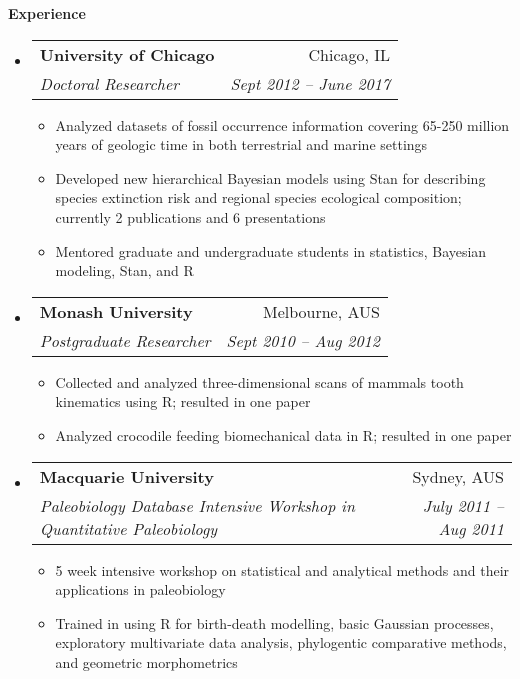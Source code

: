 \documentclass[letterpaper,11pt]{article}
\makeatletter
\newcommand{\resitem}[1]{\item #1 \vspace{-2pt}}
\newcommand{\resheading}[1]{{\large \colorbox{mygrey}{\begin{minipage}{\textwidth}{\textbf{#1 \vphantom{p\^{E}}}}\end{minipage}}}}
\newcommand{\ressubheading}[4]{
\begin{tabular*}{6.5in}{l@{\extracolsep{\fill}}r}
		\textbf{#1} & #2 \\
		\textit{#3} & \textit{#4} \\
\end{tabular*}\vspace{-6pt}}
\makeatother
\begin{document}
\resheading{Experience}
	\begin{itemize}
		\item 
			\ressubheading{University of Chicago}{Chicago, IL}{Doctoral Researcher}{Sept 2012 -- June 2017}
				{ \footnotesize
				\begin{itemize}
            \resitem{Analyzed datasets of fossil occurrence information covering 65-250 million years of geologic time in both terrestrial and marine settings }
            \resitem{Developed new hierarchical Bayesian models using Stan for describing species extinction risk and regional species ecological composition; currently 2 publications and 6 presentations }
            \resitem{Mentored graduate and undergraduate students in statistics, Bayesian modeling, Stan, and R }
				\end{itemize}
				}
		\item 
			\ressubheading{Monash University}{Melbourne, AUS}{Postgraduate Researcher}{Sept 2010 -- Aug 2012}
				{ \footnotesize
				\begin{itemize}
            \resitem{Collected and analyzed three-dimensional scans of mammals tooth kinematics using R; resulted in one paper }
            \resitem{Analyzed crocodile feeding biomechanical data in R; resulted in one paper }
				\end{itemize}
				}
		\item 
			\ressubheading{Macquarie University}{Sydney, AUS}{Paleobiology Database Intensive Workshop in Quantitative Paleobiology}{July 2011 -- Aug 2011}
				{ \footnotesize
				\begin{itemize}
            \resitem{5 week intensive workshop on statistical and analytical methods and their applications in paleobiology}
            \resitem{Trained in using R for birth-death modelling, basic Gaussian processes, exploratory multivariate data analysis, phylogentic comparative methods, and geometric morphometrics}
				\end{itemize}
				}

\end{itemize}
\end{document}
